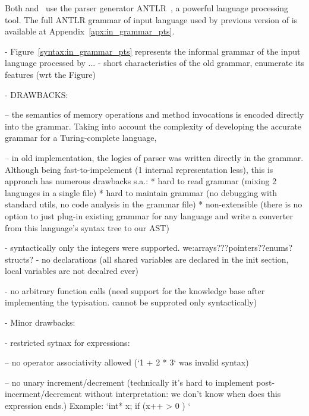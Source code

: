 Both \porthos{} and \porthos[2] \ use the parser generator ANTLR~\cite{parr2013definitive}, a powerful language processing tool.
The full ANTLR grammar of input language used by previous version of \porthos{} is available at Appendix~\ref{apx:in_grammar_pts}.


- Figure~\ref{syntax:in_grammar_pts} represents the informal grammar of the input language processed by \porthos[1] ... %
- short characteristics of the old grammar, enumerate its features (wrt the Figure)

- DRAWBACKS: %

    -- the semantics of memory operations and method invocations is encoded directly into the grammar.
    Taking into account the complexity of developing the accurate grammar for a Turing-complete language,

    -- in old implementation, the logics of parser was written directly in the grammar.
    Although being fast-to-impelement (1 internal representation less), this is approach has numerous drawbacks s.a.:
    * hard to read grammar (mixing 2 languages in a single file)
    * hard to maintain grammar (no debugging with standard utils, no code analysis in the grammar file)
    * non-extensible (there is no option to just plug-in existing grammar for any language and write a converter from this language's syntax tree to our AST)


    - syntactically only the integers were supported. we:arrays???pointers??enums?structs?
    - no declarations (all shared variables are declared in the init section, local variables are not decalred ever)

    - no arbitrary function calls (need support for the knowledge base after implementing the typisation. cannot be supproted only syntactically)


- Minor drawbacks:

    - restricted sytnax for expressions:

    -- no operator associativity allowed (`1 + 2 * 3` was invalid syntax)

    -- no unary increment/decrement (technically it's hard to implement post-incerment/decrement without interpretation: we don't know when does this expression ends.)
    Example:
    `int* x;
    if (x++ > 0 ) { }`

